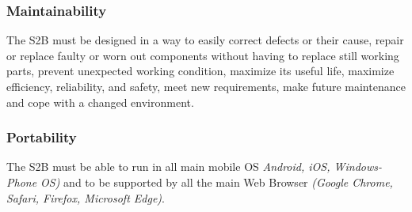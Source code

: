 	\subsubsection{Maintainability}
	The S2B must be designed in a way to easily correct defects or their cause,
	repair or replace faulty or worn out components without having to replace still working parts,
	prevent unexpected working condition,
	maximize its useful life,
	maximize efficiency, reliability, and safety,
	meet new requirements,
	make future maintenance and
	cope with a changed environment.
	
	\subsubsection{Portability}
	The S2B must be able to run in all main mobile OS \textit{Android, iOS, Windows-Phone OS)} and to be supported by all the main Web Browser \textit{(Google Chrome, Safari, Firefox, Microsoft Edge)}.
	
